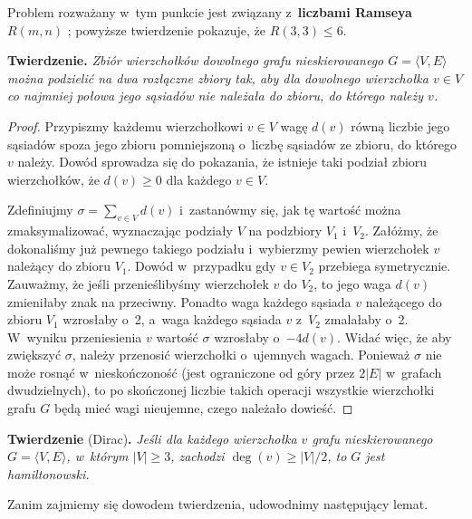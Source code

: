 Problem rozważany w~tym punkcie jest związany z~\textbf{liczbami Ramseya} $R(m,n)$ \cite{ramseynumber}; powyższe twierdzenie pokazuje, że $R(3,3)\le6$.

\subproblem %
\textsf{\textbf{Twierdzenie.}} \textit{Zbiór wierzchołków dowolnego grafu nieskierowanego\/ $G=\langle V,E\rangle$ można podzielić na dwa rozłączne zbiory tak, aby dla dowolnego wierzchołka\/ $v\in V$ co najmniej połowa jego sąsiadów nie należała do zbioru, do którego należy\/ $v$.}
\begin{proof}
Przypiszmy każdemu wierzchołkowi $v\in V$ wagę $d(v)$ równą liczbie jego sąsiadów spoza jego zbioru pomniejszoną o~liczbę sąsiadów ze zbioru, do którego $v$ należy.
Dowód sprowadza się do pokazania, że istnieje taki podział zbioru wierzchołków, że $d(v)\ge0$ dla każdego $v\in V$\!.

Zdefiniujmy $\sigma=\sum_{v\in V}d(v)$ i~zastanówmy się, jak tę wartość można zmaksymalizować, wyznaczając podziały $V$ na podzbiory $V_1$ i~$V_2$.
Załóżmy, że dokonaliśmy już pewnego takiego podziału i~wybierzmy pewien wierzchołek $v$ należący do zbioru $V_1$.
Dowód w~przypadku gdy $v\in V_2$ przebiega symetrycznie.
Zauważmy, że jeśli przenieślibyśmy wierzchołek $v$ do $V_2$, to jego waga $d(v)$ zmieniłaby znak na przeciwny.
Ponadto waga każdego sąsiada $v$ należącego do zbioru $V_1$ wzrosłaby o~2, a~waga każdego sąsiada $v$ z~$V_2$ zmalałaby o~2.
W~wyniku przeniesienia $v$ wartość $\sigma$ wzrosłaby o~$-4d(v)$.
Widać więc, że aby zwiększyć $\sigma$, należy przenosić wierzchołki o~ujemnych wagach.
Ponieważ $\sigma$ nie może rosnąć w~nieskończoność (jest ograniczone od góry przez $2|E|$ w~grafach dwudzielnych), to po skończonej liczbie takich operacji wszystkie wierzchołki grafu $G$ będą mieć wagi nieujemne, czego należało dowieść.
\end{proof}

\subproblem %
\textsf{\textbf{Twierdzenie} (Dirac)\textbf{.}} \textit{Jeśli dla każdego wierzchołka\/ $v$ grafu nieskierowanego\/ $G=\langle V,E\rangle$, w~którym\/ $|V|\ge3$, zachodzi\/ $\deg(v)\ge|V|/2$, to\/ $G$ jest hamiltonowski.}

\medskip
\noindent Zanim zajmiemy się dowodem twierdzenia, udowodnimy następujący lemat.

